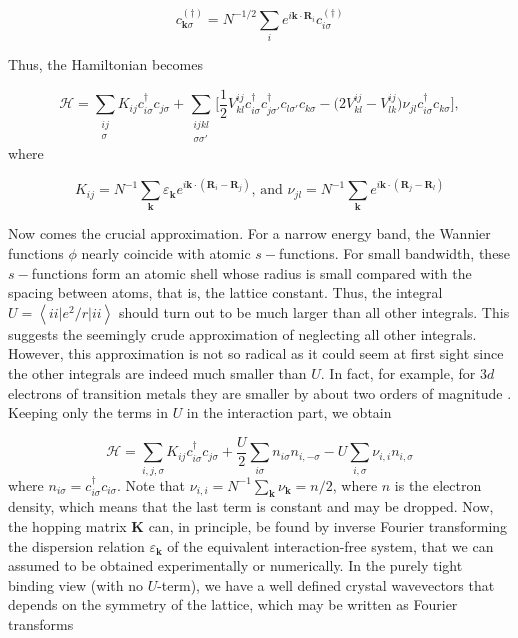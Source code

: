 \begin{equation}
c_{\bm k \sigma}^{(\dagger)} = N^{-1/2} \sum_i e^{i \bm k \cdot \bm R_i} c_{i\sigma}^{(\dagger)}
\end{equation}

Thus, the Hamiltonian becomes 

\begin{equation}
\mathcal{H} = \sum_{\substack{ i j \\ \sigma} } K_{ij} c_{i \sigma}^\dagger c_{j \sigma} + \sum_{\substack{i j k l \\ \sigma \sigma'} } \bigg[  \frac{1}{2} V^{i j}_{k l}
 c_{i \sigma}^\dagger c_{j \sigma'}^\dagger c_{l \sigma'} c_{ k \sigma} - \bigg( 2 V^{i j}_{k l} - V^{i j} _{l k} \bigg) \nu_{j l} c_{i \sigma}^\dagger c_{ k \sigma} \bigg]  ,
\end{equation}
where

\begin{equation}\label{eq:hopping_matrix}
K_{ij} = N^{-1} \sum_{\bm k} \varepsilon_{\bm k} e^{i \bm k \cdot ( \bm R_i - \bm R_j )}, \, \text{and} \, \, \nu_{j l} = N^{-1} \sum_{\bm k} e^{i \bm k \cdot ( \bm R_j - \bm R_l) }
\end{equation}

Now comes the crucial approximation.
For a narrow energy band, the Wannier functions $\phi$ nearly coincide with atomic $s-$functions.
For small bandwidth, these $s-$functions form an atomic shell whose radius is small compared with the spacing between atoms, that is, the lattice constant.
Thus, the integral $U = \left\langle i i \big| e^2 / r \big| i i \right\rangle$ should turn out to be much larger than all other integrals.
This suggests the seemingly crude approximation of neglecting all other integrals.
However, this approximation is not so radical as it could seem at first sight since the other integrals are indeed much smaller than $U$.
In fact, for example, for $3d$ electrons of transition metals they are smaller by about two orders of magnitude \cite{hubbard_electron_1963}.
Keeping only the terms in $U$ in the interaction part, we obtain

\begin{equation}
\mathcal{H} = \sum_{i, j, \sigma} K_{ij} c_{i\sigma}^\dagger c_{j\sigma} + \frac{U}{2} \sum_{i\sigma} n_{i\sigma} n_{i, -\sigma} - U \sum_{i, \sigma} \nu_{i, i} n_{i, \sigma}
\end{equation}
where $n_{i\sigma} = c_{i\sigma}^\dagger c_{i\sigma}$.
Note that $\nu_{i, i} = N^{-1} \sum_{\bm k} \nu_{\bm k} = n/2$, where $n$ is the electron density, which means that the last term is constant and may be dropped.
Now, the hopping matrix $\bm K$ can, in principle, be found by inverse Fourier transforming the dispersion relation $\varepsilon_{\bm k}$ of the equivalent interaction-free system, that we can assumed to be obtained experimentally or numerically.
In the purely tight binding view (with no $U$-term), we have a well defined crystal wavevectors that depends on the symmetry of the lattice, which may be written as Fourier transforms

